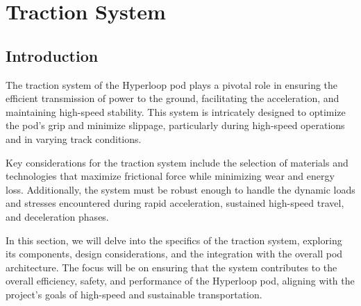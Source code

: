 \chapter{Traction System}

\section{Introduction}
The traction system of the Hyperloop pod plays a pivotal role in ensuring the efficient transmission of power to the ground, facilitating the acceleration, and maintaining high-speed stability. This system is intricately designed to optimize the pod's grip and minimize slippage, particularly during high-speed operations and in varying track conditions. 

Key considerations for the traction system include the selection of materials and technologies that maximize frictional force while minimizing wear and energy loss. Additionally, the system must be robust enough to handle the dynamic loads and stresses encountered during rapid acceleration, sustained high-speed travel, and deceleration phases. 

In this section, we will delve into the specifics of the traction system, exploring its components, design considerations, and the integration with the overall pod architecture. The focus will be on ensuring that the system contributes to the overall efficiency, safety, and performance of the Hyperloop pod, aligning with the project's goals of high-speed and sustainable transportation.






\newpage
